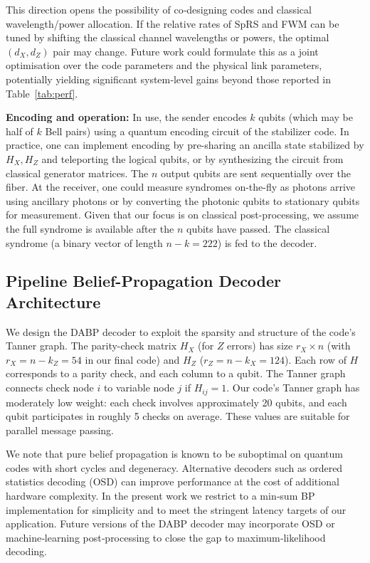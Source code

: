 \documentclass[conference]{IEEEtran}  %
\begin{document}
This direction opens the possibility of co‑designing codes and classical wavelength/power allocation.  If the relative rates of SpRS and FWM can be tuned by shifting the classical channel wavelengths or powers, the optimal $(d_X,d_Z)$ pair may change.  Future work could formulate this as a joint optimisation over the code parameters and the physical link parameters, potentially yielding significant system‑level gains beyond those reported in Table~\ref{tab:perf}.

\textbf{Encoding and operation:} In use, the sender encodes $k$ qubits (which may be half of $k$ Bell pairs) using a quantum encoding circuit of the stabilizer code. In practice, one can implement encoding by pre-sharing an ancilla state stabilized by $H_X, H_Z$ and teleporting the logical qubits, or by synthesizing the circuit from classical generator matrices. The $n$ output qubits are sent sequentially over the fiber. At the receiver, one could measure syndromes on-the-fly as photons arrive using ancillary photons or by converting the photonic qubits to stationary qubits for measurement. Given that our focus is on classical post-processing, we assume the full syndrome is available after the $n$ qubits have passed. The classical syndrome (a binary vector of length $n-k=222$) is fed to the decoder.

\subsection{Pipeline Belief-Propagation Decoder Architecture}\label{sec:implementation}
We design the DABP decoder to exploit the sparsity and structure of the code's Tanner graph. The parity-check matrix $H_X$ (for $Z$ errors) has size $r_X \times n$ (with $r_X = n-k_Z = 54$ in our final code) and $H_Z$ ($r_Z = n-k_X = 124$). Each row of $H$ corresponds to a parity check, and each column to a qubit. The Tanner graph connects check node $i$ to variable node $j$ if $H_{ij}=1$. Our code's Tanner graph has moderately low weight: each check involves approximately 20 qubits, and each qubit participates in roughly 5 checks on average. These values are suitable for parallel message passing.

We note that pure belief propagation is known to be suboptimal on quantum codes with short cycles and degeneracy.  Alternative decoders such as ordered statistics decoding (OSD) can improve performance at the cost of additional hardware complexity\cite{Valls2021}.  In the present work we restrict to a min‑sum BP implementation for simplicity and to meet the stringent latency targets of our application.  Future versions of the DABP decoder may incorporate OSD or machine‑learning post‑processing to close the gap to maximum‑likelihood decoding.
\end{document}
